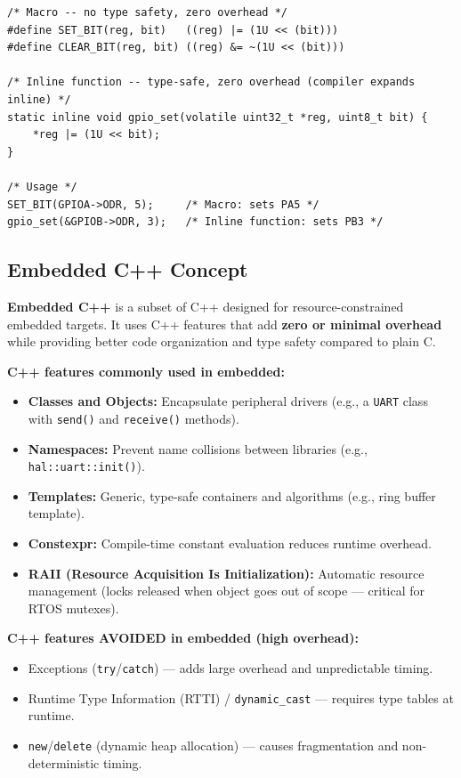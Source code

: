 \documentclass[12pt,a4paper]{article}
\begin{document}
\begin{tcolorbox}[examplebox, title={\textbf{C Macro vs.\ Inline Function Example}}]
\begin{verbatim}
/* Macro -- no type safety, zero overhead */
#define SET_BIT(reg, bit)   ((reg) |= (1U << (bit)))
#define CLEAR_BIT(reg, bit) ((reg) &= ~(1U << (bit)))

/* Inline function -- type-safe, zero overhead (compiler expands inline) */
static inline void gpio_set(volatile uint32_t *reg, uint8_t bit) {
    *reg |= (1U << bit);
}

/* Usage */
SET_BIT(GPIOA->ODR, 5);     /* Macro: sets PA5 */
gpio_set(&GPIOB->ODR, 3);   /* Inline function: sets PB3 */
\end{verbatim}
\end{tcolorbox}

\subsection{Embedded C++ Concept}

\begin{tcolorbox}[defbox, title={\textbf{Embedded C++ (EC++)}}]
\textbf{Embedded C++} is a subset of C++ designed for resource-constrained embedded targets. It uses C++ features that add \textbf{zero or minimal overhead} while providing better code organization and type safety compared to plain C.
\end{tcolorbox}

\textbf{C++ features commonly used in embedded:}
\begin{itemize}[leftmargin=*, itemsep=3pt]
  \item \textbf{Classes and Objects:} Encapsulate peripheral drivers (e.g., a \texttt{UART} class with \texttt{send()} and \texttt{receive()} methods).
  \item \textbf{Namespaces:} Prevent name collisions between libraries (e.g., \texttt{hal::uart::init()}).
  \item \textbf{Templates:} Generic, type-safe containers and algorithms (e.g., ring buffer template).
  \item \textbf{Constexpr:} Compile-time constant evaluation reduces runtime overhead.
  \item \textbf{RAII (Resource Acquisition Is Initialization):} Automatic resource management (locks released when object goes out of scope --- critical for RTOS mutexes).
\end{itemize}

\textbf{C++ features AVOIDED in embedded (high overhead):}
\begin{itemize}[leftmargin=*, itemsep=2pt]
  \item Exceptions (\texttt{try}/\texttt{catch}) --- adds large overhead and unpredictable timing.
  \item Runtime Type Information (RTTI) / \texttt{dynamic\_cast} --- requires type tables at runtime.
  \item \texttt{new}/\texttt{delete} (dynamic heap allocation) --- causes fragmentation and non-deterministic timing.
\end{itemize}
\end{document}
